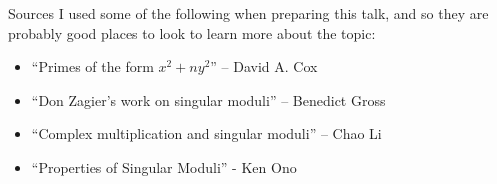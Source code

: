 \documentclass{beamer}
\begin{document}
\begin{frame}{Sources}
I used some of the following when preparing this talk, and so they are probably good places to look to learn more about the topic:
\begin{itemize}
\item ``Primes of the form $x^2 + ny^2$'' -- David A. Cox
\item ``Don Zagier's work on singular moduli'' -- Benedict Gross
\item ``Complex multiplication and singular moduli'' -- Chao Li
\item ``Properties of Singular Moduli'' - Ken Ono
\end{itemize}
\end{frame}
\end{document}
